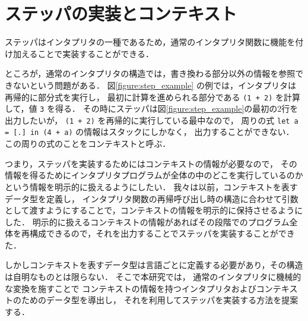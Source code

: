 \section{ステッパの実装とコンテキスト}
\label{section:context}

ステッパはインタプリタの一種であるため，通常のインタプリタ関数に機能を付け加えることで実装することができる．

ところが，通常のインタプリタの構造では，書き換わる部分以外の情報を参照できないという問題がある．
図\ref{figure:step_example} の例では，インタプリタは再帰的に部分式を実行し，
最初に計算を進められる部分である \texttt{(1 + 2)} を計算して，値 \texttt{3} を得る．
その時にステッパは図\ref{figure:step_example}の最初の2行を出力したいが，
\texttt{(1 + 2)} を再帰的に実行している最中なので，
周りの式 \texttt{let a = [.]\ in (4 + a)} の情報はスタックにしかなく，
出力することができない．
この周りの式のことをコンテキストと呼ぶ．

つまり，ステッパを実装するためにはコンテキストの情報が必要なので，
その情報を得るためにインタプリタプログラムが全体の中のどこを実行しているのかという情報を明示的に扱えるようにしたい．
我々は以前\cite{FCA19}，コンテキストを表すデータ型を定義し，
インタプリタ関数の再帰呼び出し時の構造に合わせて引数として渡すようにすることで，コンテキストの情報を明示的に保持させるようにした．
明示的に扱えるコンテキストの情報があればその段階でのプログラム全体を再構成できるので，それを出力することでステッパを実装することができた．

しかしコンテキストを表すデータ型は言語ごとに定義する必要があり，その構造は自明なものとは限らない．
そこで本研究では，
通常のインタプリタに機械的な変換を施すことで
コンテキストの情報を持つインタプリタおよびコンテキストのためのデータ型を導出し，
それを利用してステッパを実装する方法を提案する．
